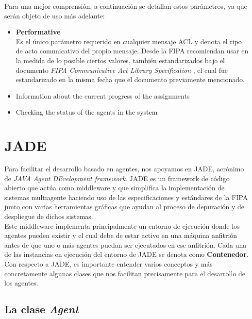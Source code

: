 Para una mejor comprensión, a continuación se detallan estos parámetros, ya que serán objeto de uso más adelante:\\

\begin{itemize}
	\item \textbf{Performative}\\
	Es el único parámetro requerido en cualquier mensaje ACL y denota el tipo de acto comunicativo del propio mensaje. Desde la FIPA recomiendan usar en la medida de lo posible ciertos valores, también estandarizados bajo el documento \textit{FIPA Communicative Act Library Specification} \cite{unknown-author-2002B}, el cual fue estandarizado en la misma fecha que el documento previamente mencionado.
	\item Information about the current progress of the assignments
	\item Checking the status of the agents in the system
\end{itemize}

\section{JADE}
\label{sec:jade}

Para facilitar el desarrollo basado en agentes, nos apoyamos en JADE, acrónimo de \textit{JAVA Agent DEvelopment framework}. JADE es un framework de código abierto que actúa como middleware y que simplifica la implementación de sistemas multiagente haciendo uso de las especificaciones y estándares de la FIPA junto con varias herramientas gráficas que ayudan al proceso de depuración y de despliegue de dichos sistemas.\\

Este middleware implementa principalmente un entorno de ejecución donde los agentes pueden existir y el cual debe de estar activo en una máquina anfitrión antes de que uno o más agentes puedan ser ejecutados en ese anfitrión. Cada una de las instancias en ejecución del entorno de JADE se denota como \textbf{Contenedor}.\\

Con respecto a JADE, es importante entender varios conceptos y más concretamente algunas clases que nos facilitan precisamente para el desarrollo de los agentes.\\

\subsection{La clase \textit{Agent}}


